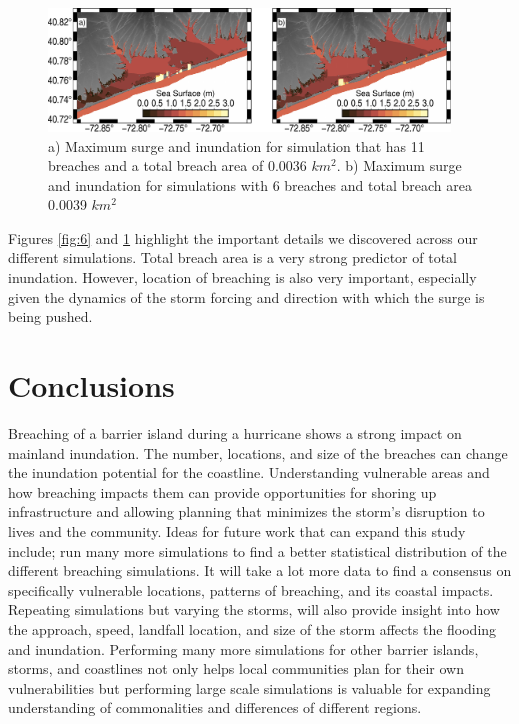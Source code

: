 \documentclass{coastal_paper}
\begin{document}
\begin{figure}
    \centering
    \includegraphics[width=0.95\textwidth]{figures/fig7_v2.pdf}
    \caption{a) Maximum surge and inundation for simulation that has 11 breaches and a total breach area of 0.0036 $km^2$. b) Maximum surge and inundation for simulations with 6 breaches and total breach area 0.0039 $km^2$}
    \label{fig:7}
\end{figure}


Figures \ref{fig:6} and \ref{fig:7} highlight the important details we discovered across our different simulations. Total breach area is a very strong predictor of total inundation. However, location of breaching is also very important, especially given the dynamics of the storm forcing and direction with which the surge is being pushed.

\section{Conclusions}
Breaching of a barrier island during a hurricane shows a strong impact on mainland inundation. The number, locations, and size of the breaches can change the inundation potential for the coastline. Understanding vulnerable areas and how breaching impacts them can provide opportunities for shoring up infrastructure and allowing planning that minimizes the storm's disruption to lives and the community.
Ideas for future work that can expand this study include; run many more simulations to find a better statistical distribution of the different breaching simulations. It will take a lot more data to find a consensus on specifically vulnerable locations, patterns of breaching, and its coastal impacts. Repeating simulations but varying the storms, will also provide insight into how the approach, speed, landfall location, and size of the storm affects the flooding and inundation. Performing many more simulations for other barrier islands, storms, and coastlines not only helps local communities plan for their own vulnerabilities but performing large scale simulations is valuable for expanding understanding of commonalities and differences of different regions.



\end{document}
